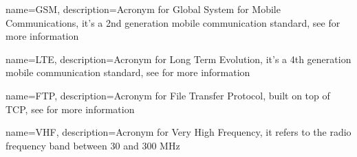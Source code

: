{
    name=GSM,
    description={Acronym for Global System for Mobile Communications, it's a 2nd generation mobile communication
    standard, see \cite{gsm_book} for more information}
}

{
    name=LTE,
    description={Acronym for Long Term Evolution, it's a 4th generation mobile communication standard, see \cite{lte_paper} for more information}
}

{
    name=FTP,
    description={Acronym for File Transfer Protocol, built on top of TCP, see \cite{ftp_rfc} for more information}
}

{
    name=VHF,
    description={Acronym for Very High Frequency, it refers to the radio frequency band between 30 and 300 MHz}
}

\makeglossaries
